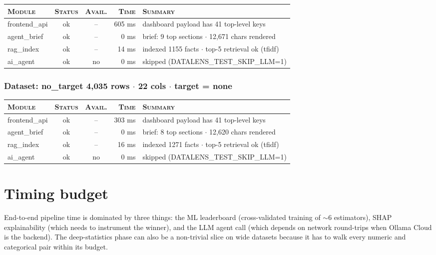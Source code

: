 \documentclass[11pt,a4paper]{article}
\begin{document}
\begin{tabularx}{\linewidth}{l c c r X}
\toprule
\textsc{Module} & \textsc{Status} & \textsc{Avail.} & \textsc{Time} & \textsc{Summary} \\
\midrule
frontend\_api & \textcolor{ok}{ok} & -- & 605 ms & dashboard payload has 41 top-level keys \\
agent\_brief & \textcolor{ok}{ok} & -- & 0 ms & brief: 9 top sections $\cdot$ 12,671 chars rendered \\
rag\_index & \textcolor{ok}{ok} & -- & 14 ms & indexed 1155 facts $\cdot$ top-5 retrieval ok (tfidf) \\
ai\_agent & \textcolor{ok}{ok} & \textcolor{ink3}{no} & 0 ms & skipped (DATALENS\_TEST\_SKIP\_LLM=1) \\
\bottomrule
\end{tabularx}


\subsubsection*{Dataset: no\_target
\hfill {\color{ink3}\footnotesize 4,035 rows
{$\boldsymbol{\cdot}$} 22 cols
{$\boldsymbol{\cdot}$} target = none}}

\begin{tabularx}{\linewidth}{l c c r X}
\toprule
\textsc{Module} & \textsc{Status} & \textsc{Avail.} & \textsc{Time} & \textsc{Summary} \\
\midrule
frontend\_api & \textcolor{ok}{ok} & -- & 303 ms & dashboard payload has 41 top-level keys \\
agent\_brief & \textcolor{ok}{ok} & -- & 0 ms & brief: 8 top sections $\cdot$ 12,620 chars rendered \\
rag\_index & \textcolor{ok}{ok} & -- & 16 ms & indexed 1271 facts $\cdot$ top-5 retrieval ok (tfidf) \\
ai\_agent & \textcolor{ok}{ok} & \textcolor{ink3}{no} & 0 ms & skipped (DATALENS\_TEST\_SKIP\_LLM=1) \\
\bottomrule
\end{tabularx}


\section{Timing budget}\label{sec:timings}

End-to-end pipeline time is dominated by three things: the ML leaderboard
(cross-validated training of $\sim 6$ estimators), SHAP explainability (which
needs to instrument the winner), and the LLM agent call (which depends on
network round-trips when Ollama Cloud is the backend). The deep-statistics
phase can also be a non-trivial slice on wide datasets because it has to
walk every numeric and categorical pair within its budget.
\end{document}
